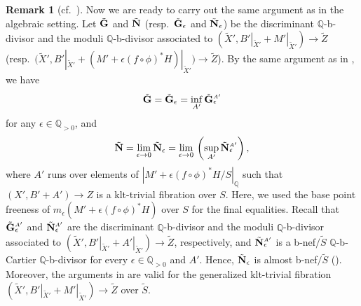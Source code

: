 \documentclass[12pt]{amsart}
\theoremstyle{definition}
\newtheorem{rem}[thm]{Remark}
\begin{document}
\begin{rem}[cf.~{\cite[Remark 4.8]{filipazzi-gen-can-bundle-formula}}]
Now we are ready to carry out the same argument as in the algebraic setting. 
Let $\tilde{\boldsymbol{\rm G}}$ and $\tilde{\boldsymbol{\rm N}}$ (resp.~$\tilde{\boldsymbol{\rm G}}_{\epsilon}$ and $\tilde{\boldsymbol{\rm N}}_{\epsilon}$) be the discriminant $\mathbb{Q}$-b-divisor and the moduli $\mathbb{Q}$-b-divisor associated to $(\tilde{X}',B'|_{\tilde{X}'}+M'|_{\tilde{X}'}) \to \tilde{Z}$ (resp.~$\bigl(\tilde{X}',B'|_{\tilde{X}'}+(M'+\epsilon(f \circ \phi)^{*}H)|_{\tilde{X}'}\bigr) \to \tilde{Z}$). 
By the same argument as in \cite[Remark 4.8]{filipazzi-gen-can-bundle-formula}, we have
$$\tilde{\boldsymbol{\rm G}}=\tilde{\boldsymbol{\rm G}}_{\epsilon}=\underset{A'}{\rm inf }\,\tilde{\boldsymbol{\rm G}}^{\underset{A'}{}}_{\epsilon}$$
for any $\epsilon \in \mathbb{Q}_{>0}$, and 
$$\tilde{\boldsymbol{\rm N}}=\underset{\epsilon \to 0}{\rm lim}\,\tilde{\boldsymbol{\rm N}}_{\epsilon}=\underset{\epsilon \to 0}{\rm lim}\,\left(\underset{A'}{\rm sup }\,\tilde{\boldsymbol{\rm N}}^{\underset{A'}{}}_{\epsilon}\right),$$
where $A'$ runs over elements of $ |M'+\epsilon(f \circ \phi)^{*}H/S|_{\mathbb{Q}}$ such that $(X',B'+A') \to Z$ is a klt-trivial fibration over $S$. 
Here, we used the base point freeness of $m_{\epsilon}(M'+\epsilon (f \circ \phi)^{*}H)$ over $S$ for the final equalities.  
Recall that $\tilde{\boldsymbol{\rm G}}^{\underset{A'}{}}_{\epsilon}$ and $\tilde{\boldsymbol{\rm N}}^{\underset{A'}{}}_{\epsilon}$ are the discriminant $\mathbb{Q}$-b-divisor and the moduli  $\mathbb{Q}$-b-divisor associated to $(\tilde{X}',B'|_{\tilde{X}'}+A'|_{\tilde{X}'}) \to \tilde{Z}$, respectively, and $\tilde{\boldsymbol{\rm N}}^{\underset{A'}{}}_{\epsilon}$ is a b-nef$/\tilde{S}$ $\mathbb{Q}$-b-Cartier $\mathbb{Q}$-b-divisor for every $\epsilon \in \mathbb{Q}_{>0}$ and $A'$. 
Hence, $\tilde{\boldsymbol{\rm N}}_{\epsilon}$ is almost b-nef$/\tilde{S}$ (\cite[Definition 4.9, Proposition 4.10]{filipazzi-gen-can-bundle-formula}). 
Moreover, the arguments in \cite{filipazzi-gen-can-bundle-formula} are valid for the generalized klt-trivial fibration $(\tilde{X}',B'|_{\tilde{X}'}+M'|_{\tilde{X}'}) \to \tilde{Z}$ over $\tilde{S}$.  
\end{rem}
\end{document}
